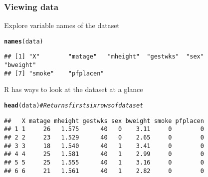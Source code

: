\documentclass{beamer}\usepackage[]{graphicx}\usepackage[]{color}
\makeatletter
\newcommand{\hlcom}[1]{\textcolor[rgb]{0.678,0.584,0.686}{\textit{#1}}}%
\newcommand{\hlstd}[1]{\textcolor[rgb]{0.345,0.345,0.345}{#1}}%
\newcommand{\hlkwd}[1]{\textcolor[rgb]{0.737,0.353,0.396}{\textbf{#1}}}%
\newenvironment{kframe}{%
 \def\at@end@of@kframe{}%
 \ifinner\ifhmode%
  \def\at@end@of@kframe{\end{minipage}}%
  \begin{minipage}{\columnwidth}%
 \fi\fi%
 \def\FrameCommand##1{\hskip\@totalleftmargin \hskip-\fboxsep
 \colorbox{shadecolor}{##1}\hskip-\fboxsep
     \hskip-\linewidth \hskip-\@totalleftmargin \hskip\columnwidth}%
 \MakeFramed {\advance\hsize-\width
   \@totalleftmargin\z@ \linewidth\hsize
   \@setminipage}}%
 {\par\unskip\endMakeFramed%
 \at@end@of@kframe}
\newenvironment{knitrout}{}{} %
\makeatother
\begin{document}
\begin{frame}[fragile]\frametitle{Viewing data}
\small
Explore variable names of the dataset
\begin{knitrout}
\color{fgcolor}\begin{kframe}
\begin{alltt}
\hlkwd{names}\hlstd{(data)}
\end{alltt}
\begin{verbatim}
## [1] "X"        "matage"   "mheight"  "gestwks"  "sex"      "bweight" 
## [7] "smoke"    "pfplacen"
\end{verbatim}
\end{kframe}
\end{knitrout}
R has ways to look at the dataset at a glance
\begin{knitrout}
\color{fgcolor}\begin{kframe}
\begin{alltt}
\hlkwd{head}\hlstd{(data)}  \hlcom{#Returns first six rows of dataset}
\end{alltt}
\begin{verbatim}
##   X matage mheight gestwks sex bweight smoke pfplacen
## 1 1     26   1.575      40   0    3.11     0        0
## 2 2     23   1.529      40   0    2.65     0        0
## 3 3     18   1.540      40   1    3.41     0        0
## 4 4     25   1.581      40   1    2.99     0        0
## 5 5     25   1.555      40   1    3.16     0        0
## 6 6     21   1.561      40   1    2.82     0        0
\end{verbatim}
\end{kframe}
\end{knitrout}
\end{frame}
\end{document}
